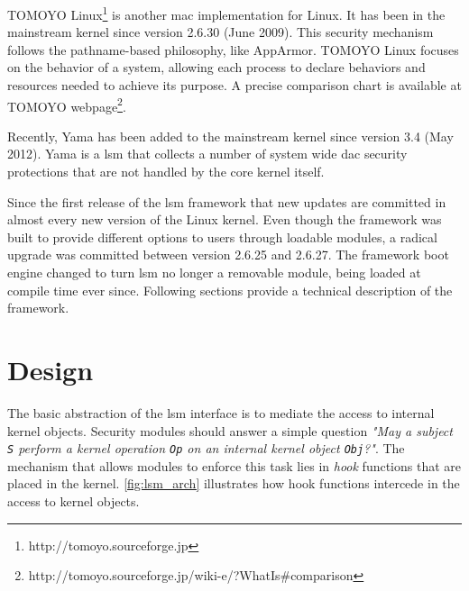 TOMOYO Linux\footnote{http://tomoyo.sourceforge.jp} is another \gls{mac} implementation for Linux. It has been in the mainstream kernel since version 2.6.30 (June 2009). This security mechanism follows the pathname-based philosophy, like AppArmor. TOMOYO Linux focuses on the behavior of a system, allowing each process to declare behaviors and resources needed to achieve its purpose. A precise comparison chart is available at TOMOYO webpage\footnote{http://tomoyo.sourceforge.jp/wiki-e/?WhatIs#comparison}.

Recently, Yama has been added to the mainstream kernel since version 3.4 (May 2012). Yama is a \gls{lsm} that collects a number of system wide \gls{dac} security protections that are not handled by the core kernel itself.

Since the first release of the \gls{lsm} framework that new updates are committed in almost every new version of the Linux kernel. Even though the framework was built to provide different options to users through loadable modules, a radical upgrade was committed between version 2.6.25 and 2.6.27. The framework boot engine changed to turn \gls{lsm} no longer a removable module, being loaded at compile time ever since. Following sections provide a technical description of the framework.

\section{Design}

The basic abstraction of the \gls{lsm} interface is to mediate the access to internal kernel objects. Security modules should answer a simple question \textit{"May a subject \texttt{S} perform a kernel operation \texttt{Op} on an internal kernel object \texttt{Obj}?"}. The mechanism that allows modules to enforce this task lies in \textit{hook} functions that are placed in the kernel. \autoref{fig:lsm_arch} illustrates how hook functions intercede in the access to kernel objects.

